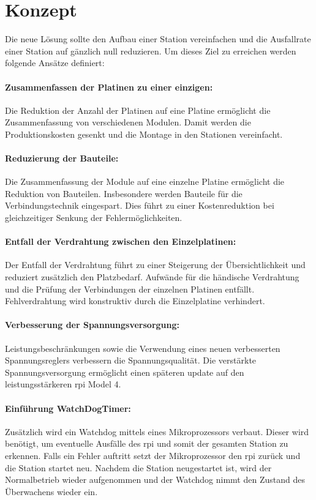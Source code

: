 \wip
\section{Konzept}
Die neue Lösung sollte den Aufbau einer Station vereinfachen und die Ausfallrate einer Station auf gänzlich null reduzieren.
Um dieses Ziel zu erreichen werden folgende Ansätze definiert:

\paragraph{Zusammenfassen der Platinen zu einer einzigen:}
Die Reduktion der Anzahl der Platinen auf eine Platine ermöglicht die Zusammenfassung von verschiedenen Modulen.
Damit werden die Produktionskosten gesenkt und die Montage in den Stationen vereinfacht.

\paragraph{Reduzierung der Bauteile:}
Die Zusammenfassung der Module auf eine einzelne Platine ermöglicht die Reduktion von Bauteilen.
Insbesondere werden Bauteile für die Verbindungstechnik eingespart.
Dies führt zu einer Kostenreduktion bei gleichzeitiger Senkung der Fehlermöglichkeiten. 

\paragraph{Entfall der Verdrahtung zwischen den Einzelplatinen:}
Der Entfall der Verdrahtung führt zu einer Steigerung der Übersichtlichkeit und reduziert zusätzlich den Platzbedarf.
Aufwände für die händische Verdrahtung und die Prüfung der Verbindungen der einzelnen Platinen entfällt.
Fehlverdrahtung wird konstruktiv durch die Einzelplatine verhindert.

\paragraph{Verbesserung der Spannungsversorgung:}
Leistungsbeschränkungen sowie die Verwendung eines neuen verbesserten Spannungsreglers verbessern die Spannungsqualität.
Die verstärkte Spannungsversorgung ermöglicht einen späteren update auf den leistungsstärkeren \ac{rpi} Model 4.

\paragraph{Einführung WatchDogTimer:}
Zusätzlich wird ein Watchdog mittels eines Mikroprozessors verbaut.
Dieser wird benötigt, um eventuelle Ausfälle des \ac{rpi} und somit der gesamten Station zu erkennen.
Falls ein Fehler auftritt setzt der Mikroprozessor den \ac{rpi} zurück und die Station startet neu.
Nachdem die Station neugestartet ist, wird der Normalbetrieb wieder aufgenommen und der Watchdog nimmt den Zustand des Überwachens wieder ein.

